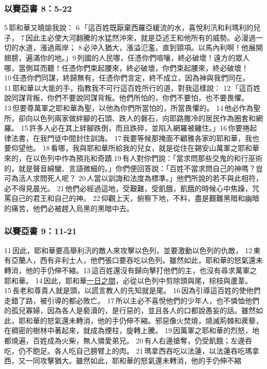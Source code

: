 \subsubsection{以賽亞書 8：5-22}
5 耶和華又曉諭我說： 6 「這百姓既厭棄西羅亞緩流的水，喜悅利汛和利瑪利的兒子， 7 因此主必使大河翻騰的水猛然沖來，就是亞述王和他所有的威勢。必漫過一切的水道，漲過兩岸； 8 必沖入猶大，漲溢氾濫，直到頸項。以馬內利啊！他展開翅膀，遍滿你的地。」9 列國的人民哪，任憑你們喧嚷，終必破壞！遠方的眾人哪，當側耳而聽！任憑你們束起腰來，終必破壞，你們束起腰來，終必破壞！ 10 任憑你們同謀，終歸無有，任憑你們言定，終不成立，因為神與我們同在。 11 耶和華以大能的手，指教我不可行這百姓所行的道，對我這樣說： 12 「這百姓說同謀背叛，你們不要說同謀背叛。他們所怕的，你們不要怕，也不要畏懼。 13 但要尊萬軍之耶和華為聖，以他為你們所當怕的，所當畏懼的。 14 他必作為聖所，卻向以色列兩家做絆腳的石頭、跌人的磐石，向耶路撒冷的居民作為圈套和網羅。 15 許多人必在其上絆腳跌倒，而且跌碎，並陷入網羅被纏住。」16 你要捲起律法書，在我門徒中間封住訓誨。 17 我要等候那掩面不顧雅各家的耶和華，我也要仰望他。 18 看哪，我與耶和華所給我的兒女，就是從住在錫安山萬軍之耶和華來的，在以色列中作為預兆和奇蹟.19 有人對你們說：「當求問那些交鬼的和行巫術的，就是聲音綿蠻、言語微細的。」你們便回答說：「百姓不當求問自己的神嗎？豈可為活人求問死人呢？ 20 人當以訓誨和法度為標準。」他們所說的若不與此相符，必不得見晨光。 21 他們必經過這地，受艱難，受飢餓，飢餓的時候心中焦躁，咒罵自己的君王和自己的神。 22 仰觀上天，俯察下地，不料，盡是艱難黑暗和幽暗的痛苦，他們必被趕入烏黑的黑暗中去。


\subsubsection{以賽亞書 9：11-21}
11 因此，耶和華要高舉利汛的敵人來攻擊以色列，並要激動以色列的仇敵， 12 東有亞蘭人，西有非利士人，他們張口要吞吃以色列。雖然如此，耶和華的怒氣還未轉消，他的手仍伸不縮。13 這百姓還沒有歸向擊打他們的主，也沒有尋求萬軍之耶和華。 14 因此，耶和華\underline{一日之間}，必從以色列中剪除頭與尾，棕枝與蘆葦。 15 長老和尊貴人就是頭，以謊言教人的先知就是尾。 16 因為引導這百姓的使他們走錯了路，被引導的都必敗亡。 17 所以主必不喜悅他們的少年人，也不憐恤他們的孤兒寡婦，因為各人是褻瀆的，是行惡的，並且各人的口都說愚妄的話。雖然如此，耶和華的怒氣還未轉消，他的手仍伸不縮。邪惡像火焚燒，燒滅荊棘和蒺藜，在稠密的樹林中著起來，就成為煙柱，旋轉上騰。 19 因萬軍之耶和華的烈怒，地都燒遍，百姓成為火柴，無人憐愛弟兄。 20 有人右邊搶奪，仍受飢餓；左邊吞吃，仍不飽足。各人吃自己膀臂上的肉。 21 瑪拿西吞吃以法蓮，以法蓮吞吃瑪拿西，又一同攻擊猶大。雖然如此，耶和華的怒氣還未轉消，他的手仍伸不縮

